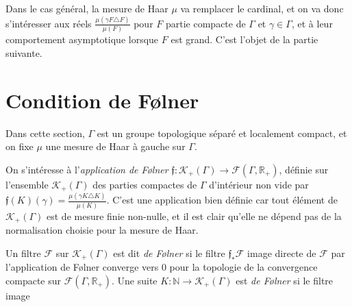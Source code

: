 \documentclass[a4paper,12pt]{article}
\newcommand{\R}{\mathbb{R}}
\newcommand{\N}{\mathbb{N}}
\begin{document}
Dans le cas général, la mesure de Haar $\mu$ va remplacer le cardinal, et on va donc s'intéresser aux réels $\frac{\mu(\gamma F \triangle F)}{\mu(F)}$ 
pour $F$ partie compacte de $\Gamma$ et $\gamma\in\Gamma$, et à leur comportement asymptotique
lorsque $F$ est grand. C'est l'objet de la partie suivante.

\section{Condition de F\o{}lner}

Dans cette section, $\Gamma$ est un groupe topologique séparé et localement compact, et on fixe 
$\mu$ une mesure de Haar à gauche sur $\Gamma$.

On s'intéresse à l'\emph{application de F\o{}lner} $\mathfrak{f} : \mathcal{K}_+(\Gamma) \to \mathcal{F}(\Gamma, \R_+)$, définie sur l'ensemble 
$\mathcal{K}_+(\Gamma)$ des parties compactes de $\Gamma$ d'intérieur non vide par $\mathfrak{f}(K)(\gamma) = \frac{\mu(\gamma K \triangle K)}{\mu(K)}$.
C'est une application bien définie car tout élément de $\mathcal{K}_+(\Gamma)$ est de mesure finie non-nulle,
et il est clair qu'elle ne dépend pas de la normalisation choisie pour la mesure de Haar.

Un filtre $\mathscr{F}$ sur $\mathcal{K}_+(\Gamma)$ est dit \emph{de F\o{}lner} si le filtre $\mathfrak{f}_*\mathscr{F}$ image directe 
de $\mathscr{F}$ par l'application de F\o{}lner converge vers $0$ pour la topologie de la convergence compacte sur $\mathcal{F}(\Gamma, \R_+)$.
Une suite $K:\N\to\mathcal{K}_+(\Gamma)$ est \emph{de F\o{}lner} si le filtre image 
\end{document}
